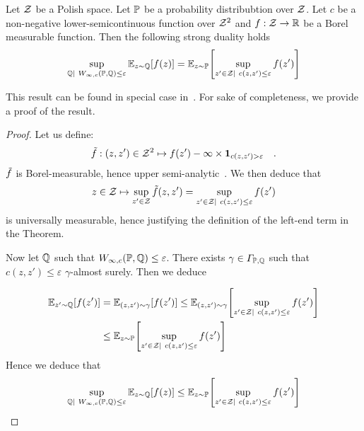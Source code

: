\begin{thm}
Let $\mathcal{Z}$ be a Polish space. Let $\mathbb{P}$ be a probability distribubtion over $\mathcal{Z}$. Let $c$ be a non-negative lower-semicontinuous function over $\mathcal{Z}^2$ and $f:\mathcal{Z}\to \mathbb{R}$ be a Borel measurable function. Then the following strong duality holds
    \begin{align*}
        \sup_{\QQ|~W_{\infty,c}(\PP,\QQ)\leq \varepsilon}\mathbb{E}_{z\sim\QQ}\left[f(z)\right] = \mathbb{E}_{z\sim\PP}\left[\sup_{z'\in \ZZ|~c(z,z')\leq\varepsilon} f(z')\right]
    \end{align*}  
\end{thm}
This result can be found in special case in~\citep{xxx}. For sake of completeness, we provide a proof of the result. 
\begin{proof}
     Let us define:
     \begin{align*}
        \Tilde{f}:(z,z')\in\mathcal{Z}^2\mapsto f(z')-\infty\times\mathbf{1}_{c(z,z')>\varepsilon}\quad. 
     \end{align*}
     $\Tilde{f}$ is Borel-measurable, hence upper semi-analytic~\citep[Chapter 7]{bertsekas2004stochastic}. We then deduce that 
     \begin{align*}
       z\in\mathcal{Z}\mapsto \sup_{z'\in\mathcal{Z}} \Tilde{f}(z,z') = \sup_{z'\in \mathcal{Z}|~c(z,z')\leq\varepsilon} f(z')
     \end{align*}
     is universally measurable, hence justifying the definition of the left-end term in the Theorem. 

     Now let $\mathbb{Q}$ such that $W_{\infty,c}(\mathbb{P},\mathbb{Q})\leq \varepsilon$. There exists $\gamma\in\Gamma_{\mathbb{P},\mathbb{Q}}$ such that $c(z,z')\leq \varepsilon$ $\gamma$-almost surely. Then we deduce

     \begin{align*}
        \mathbb{E}_{z'\sim\QQ}\left[f(z')\right] &= \mathbb{E}_{(z,z')\sim\gamma}\left[f(z')\right]\leq\mathbb{E}_{(z,z')\sim\gamma}\left[\sup_{z'\in \ZZ|~c(z,z')\leq\varepsilon} f(z')\right] \\
       & \leq\mathbb{E}_{z\sim \PP}\left[\sup_{z'\in \ZZ|~c(z,z')\leq\varepsilon} f(z')\right]
      \end{align*}
      Hence we deduce that 
      \begin{align*}
        \sup_{\QQ|~W_{\infty,c}(\PP,\QQ)\leq \varepsilon}\mathbb{E}_{z\sim\QQ}\left[f(z)\right] \leq\mathbb{E}_{z\sim\PP}\left[\sup_{z'\in \ZZ|~c(z,z')\leq\varepsilon} f(z')\right]
      \end{align*}
     

\end{proof}
